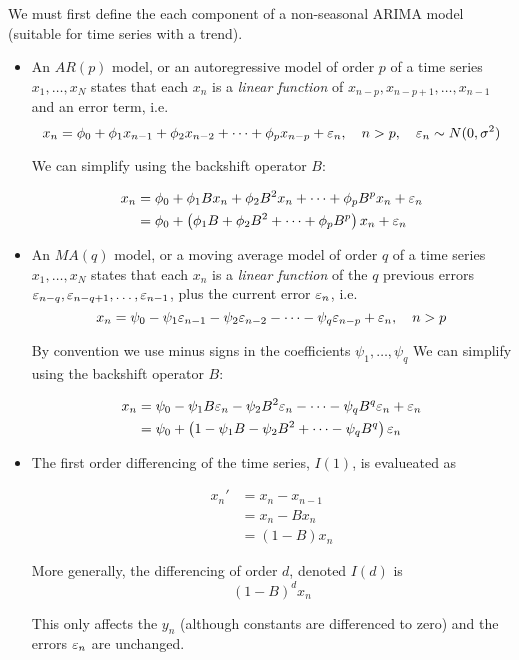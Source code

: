 We must first define the each component of a non-seasonal ARIMA model (suitable for time series with a trend).

\begin{itemize}
\item An $AR(p)$ model, or an autoregressive model of order $p$ of a time series $x_1,\dots,x_N$ states that each $x_n$ is a \textit{linear function} of $x_{n-p},x_{n-p+1},\dots,x_{n-1}$ and an error term, i.e. 
$$x_n= \phi_0+\phi_1 x_{n-1}+\phi_2 x_{n-2} +\dots + \phi_p x_{n-p}+\varepsilon_n,\quad n>p,\quad \varepsilon_n\sim N(0,\sigma^2)$$

We can simplify using the backshift operator $B$:

\begin{align}
x_n
&= \phi_0+\phi_1 Bx_n+\phi_2 B^2x_n +\dots + \phi_p B^px_n +\varepsilon_n\nonumber \\
&= \phi_0+\left(\phi_1 B+\phi_2 B^2 +\dots + \phi_p B^p\right)x_n +\varepsilon_n
\end{align}

\item An $MA(q)$ model, or a moving average model of order $q$ of a time series $x_1,\dots,x_N$ states that each $x_n$ is a \textit{linear function} of the $q$ previous errors $\varepsilon_{n-q},\varepsilon_{n-q+1},\dots,\varepsilon_{n-1}$, plus the current error $\varepsilon_n$, i.e. 
$$x_n= \psi_0-\psi_1 \varepsilon_{n-1}-\psi_2 \varepsilon_{n-2} -\dots - \psi_q \varepsilon_{n-p}+\varepsilon_n,\quad n>p$$

By convention we use minus signs in the coefficients $\psi_1,\dots,\psi_q$
We can simplify using the backshift operator $B$:

\begin{align}
x_n
&= \psi_0-\psi_1 B\varepsilon_n-\psi_2 B^2\varepsilon_n -\dots - \psi_q B^q\varepsilon_n + \varepsilon_n \nonumber \\
&= \psi_0+\left(1-\psi_1 B-\psi_2 B^2 +\dots - \psi_q B^q\right)\varepsilon_n 
\end{align}

\item The first order differencing of the time series, $I(1)$, is evalueated as 

\begin{align}
x_n'
&=x_n-x_{n-1}\nonumber \\
&=x_n-Bx_n \nonumber \\
&=\left(1-B\right)x_n
\end{align}

More generally, the differencing of order $d$, denoted $I(d)$ is 
$$(1-B)^d x_n$$

This only affects the $y_n$ (although constants are differenced to zero) and the errors $\varepsilon_n$ are unchanged.
\end{itemize}

